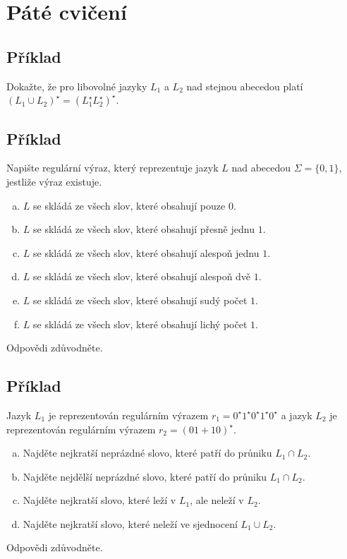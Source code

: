 \section{Páté cvičení}

\subsection{Příklad}
Dokažte, že pro libovolné jazyky $L_1$ a $L_2$ nad stejnou abecedou platí $(L_1 \cup L_2)^\star = (L_1^\star L_2^\star)^\star$.

\subsection{Příklad}
Napište regulární výraz, který reprezentuje jazyk $L$ nad abecedou $\Sigma = \{0,1\}$, jestliže výraz existuje.
\begin{enumerate}[a), noitemsep]
    \item $L$ se skládá ze všech slov, které obsahují pouze $0$.
    \item $L$ se skládá ze všech slov, které obsahují přesně jednu $1$.
    \item $L$ se skládá ze všech slov, které obsahují alespoň jednu $1$.
    \item $L$ se skládá ze všech slov, které obsahují alespoň dvě $1$.
    \item $L$ se skládá ze všech slov, které obsahují sudý počet $1$.
    \item $L$ se skládá ze všech slov, které obsahují lichý počet $1$.
\end{enumerate}
Odpovědi zdůvodněte.

\subsection{Příklad}
Jazyk $L_1$ je reprezentován regulárním výrazem $r_1 = 0^\star1^\star0^\star1^\star0^\star$ a jazyk $L_2$ je reprezentován regulárním výrazem $r_2 = (01 + 10)^\star$.
\begin{enumerate}[a), noitemsep]
    \item Najděte nejkratší neprázdné slovo, které patří do průniku $L_1 \cap L_2$.
    \item Najděte nejdělší neprázdné slovo, které patří do průniku $L_1 \cap L_2$.
    \item Najděte nejkratší slovo, které leží v $L_1$, ale neleží v $L_2$.
    \item Najděte nejkratší slovo, které neleží ve sjednocení $L_1 \cup L_2$.
\end{enumerate}
Odpovědi zdůvodněte.

